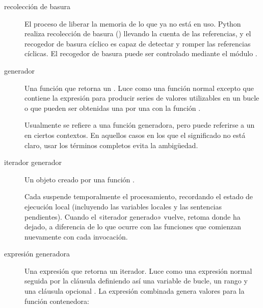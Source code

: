 \documentclass[a4,10pt,spanish]{sphinxmanual}
\begin{document}
\begin{description}
\item[{recolección de basura\label{\detokenize{glossary:term-garbage-collection}}}] \leavevmode
\sphinxAtStartPar
El proceso de liberar la memoria de lo que ya no está en uso.  Python realiza recolección de basura () llevando la cuenta de las referencias, y el recogedor de basura cíclico es capaz de detectar y romper las referencias cíclicas.  El recogedor de basura puede ser controlado mediante el módulo  .

\ignorespaces 
\item[{generador\label{\detokenize{glossary:term-generator}}}] \leavevmode
\sphinxAtStartPar
Una función que retorna un {\hyperref[\detokenize{glossary:term-generator-iterator}]{}}.  Luce como una función normal excepto que contiene la expresión  para producir series de valores utilizables en un bucle  o que pueden ser obtenidas una por una con la función .

\sphinxAtStartPar
Usualmente se refiere a una función generadora, pero puede referirse a un  en ciertos contextos.  En aquellos casos en los que el significado no está claro, usar los términos completos  evita la ambigüedad.

\item[{iterador generador\label{\detokenize{glossary:term-generator-iterator}}}] \leavevmode
\sphinxAtStartPar
Un objeto creado por una función {\hyperref[\detokenize{glossary:term-generator}]{}}.

\sphinxAtStartPar
Cada  suspende temporalmente el procesamiento, recordando el estado de ejecución local (incluyendo las variables locales y las sentencias  pendientes).  Cuando el «iterador generado» vuelve, retoma donde ha dejado, a diferencia de lo que ocurre con las funciones que comienzan nuevamente con cada invocación.

\ignorespaces 
\item[{expresión generadora\label{\detokenize{glossary:term-generator-expression}}}] \leavevmode
\sphinxAtStartPar
Una expresión que retorna un iterador.  Luce como una expresión normal seguida por la cláusula  definiendo así una variable de bucle, un rango y una cláusula opcional .  La expresión combinada genera valores para la función contenedora:


\end{description}
\end{document}
